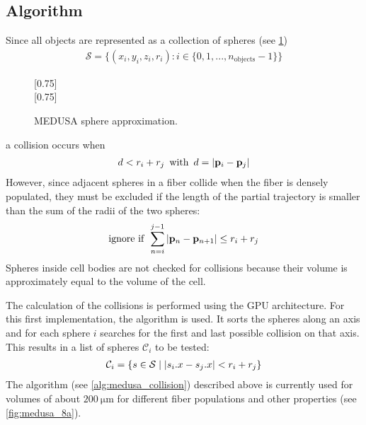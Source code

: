 \subsection{Algorithm}
%
Since all objects are represented as a collection of spheres (see \cref{fig:medusaCell})
\begin{align}
    \mathcal{S} = \{ (x_i,y_i,z_i,r_i) : i \in \{0, 1, ..., n_\text{objects}-1\}  \}
\end{align}
%
\begin{figure}[!t]
    \centering
    \setlength{\tikzwidth}{0.75\textwidth}
    [0.75\textwidth]{}
    \\[2em]
    [0.75\textwidth]{}
    \caption[]{\ac{MEDUSA} sphere approximation.}
    \label{fig:medusaCell}
\end{figure}
%
a collision occurs when
%
\begin{align}
d<r_i+r_j \enspace \text{with} \enspace d = \lvert\mathbf{p}_i - \mathbf{p}_j\rvert
\end{align}
%
However, since adjacent spheres in a fiber collide when the fiber is densely populated, they must be excluded if the length of the partial trajectory is smaller than the sum of the radii of the two spheres:
\begin{align}
\text{ignore if} \enspace \sum_{n=i}^{j-1} \, \lvert\mathbf{p}_n - \mathbf{p}_{n+1}\rvert \leq  r_i + r_j 
\end{align}
%
Spheres inside cell bodies are not checked for collisions because their volume is approximately equal to the volume of the cell.
\par
%
The calculation of the collisions is performed using the GPU architecture.
For this first implementation, the algorithm  \cite{Karras2012} is used.
It sorts the spheres along an axis and for each sphere $i$ searches for the first and last possible collision on that axis.
This results in a list of spheres $\mathcal{C}_i$ to be tested:
\begin{align}
\begin{split}
\mathcal{C}_i = \{ s \in \mathcal{S} \mid \lvert s_i.x - s_j.x\rvert < r_i+r_j \}
\end{split}
\end{align}
%
The algorithm (see \cref{alg:medusa_collision}) described above is currently used for volumes of about $\SI{200}{\micro\meter}$ for different fiber populations and other properties (see \cref{fig:medusa_8a}).
